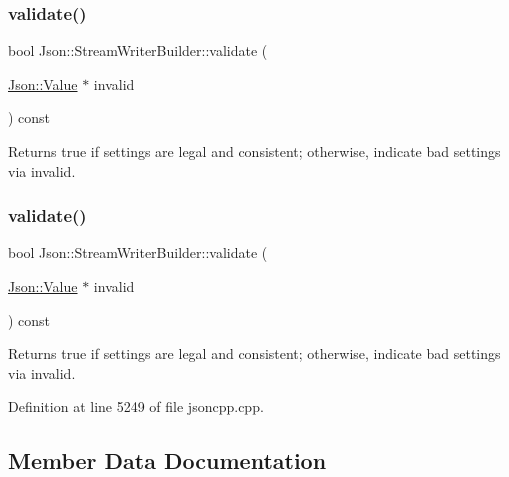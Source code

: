 \subsubsection{\texorpdfstring{validate()}{validate()}\hspace{0.1cm}{\footnotesize\ttfamily [1/2]}}
{\footnotesize\ttfamily bool Json\+::\+Stream\+Writer\+Builder\+::validate (\begin{DoxyParamCaption}\item[{\hyperlink{class_json_1_1_value}{Json\+::\+Value} $\ast$}]{invalid }\end{DoxyParamCaption}) const}

\begin{DoxyReturn}{Returns}
true if \textquotesingle{}settings\textquotesingle{} are legal and consistent; otherwise, indicate bad settings via \textquotesingle{}invalid\textquotesingle{}. 
\end{DoxyReturn}
\hypertarget{class_json_1_1_stream_writer_builder_a12353b97766841db7d049da84658da09}{}\label{class_json_1_1_stream_writer_builder_a12353b97766841db7d049da84658da09} 
\subsubsection{\texorpdfstring{validate()}{validate()}\hspace{0.1cm}{\footnotesize\ttfamily [2/2]}}
{\footnotesize\ttfamily bool Json\+::\+Stream\+Writer\+Builder\+::validate (\begin{DoxyParamCaption}\item[{\hyperlink{class_json_1_1_value}{Json\+::\+Value} $\ast$}]{invalid }\end{DoxyParamCaption}) const}

\begin{DoxyReturn}{Returns}
true if \textquotesingle{}settings\textquotesingle{} are legal and consistent; otherwise, indicate bad settings via \textquotesingle{}invalid\textquotesingle{}. 
\end{DoxyReturn}


Definition at line 5249 of file jsoncpp.\+cpp.



\subsection{Member Data Documentation}
\hypertarget{class_json_1_1_stream_writer_builder_a79bdf2e639a52f4e758c0b95bd1d3423}{}\label{class_json_1_1_stream_writer_builder_a79bdf2e639a52f4e758c0b95bd1d3423} 

